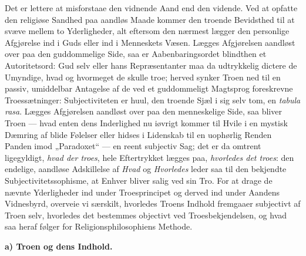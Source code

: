 \documentclass[12pt]{book}
\newcommand{\runhead}[1]{%
  \medskip\begin{center}{\bfseries #1}\end{center}\medskip}
\begin{document}
Det er lettere at misforstaae den vidnende Aand end den vidende. Ved
at opfatte den religiøse Sandhed paa aandløs Maade kommer den
troende Bevidsthed til at svæve mellem to Yderligheder, alt eftersom
den nærmest lægger den personlige Afgjørelse ind i Guds eller ind i
Menneskets Væsen. Lægges Afgjørelsen aandløst over paa den
guddommelige Side, saa er Aabenbaringsordet blindthen et
Autoritetsord: Gud selv eller hans Repræsentanter maa da udtrykkelig
dictere de Umyndige, hvad og hvormeget de skulle troe; herved synker
Troen ned til en passiv, umiddelbar Antagelse af de ved et
guddommeligt Magtsprog foreskrevne Troessætninger: Subjectiviteten
er huul, den troende Sjæl i sig selv tom, en \textit{tabula rasa}.
Lægges Afgjørelsen aandløst over paa den menneskelige Side, saa
bliver Troen --- hvad enten dens Inderlighed nu iøvrigt kommer til
Hvile i en mystisk Dæmring af blide Følelser eller hidses i
Lidenskab til en uophørlig Renden Panden imod „Paradoxet“ --- en
reent subjectiv Sag; det er da omtrent ligegyldigt, \emph{hvad der
troes}, hele Eftertrykket lægges paa, \emph{hvorledes det troes}:
den endelige, aandløse Adskillelse af \emph{Hvad} og
\emph{Hvorledes} leder saa til den bekjendte
Subjectivitetssophisme, at Enhver bliver salig ved sin Tro. For at
drage de nævnte Yderligheder ind under Troesprincipet og derved ind
under Aandens Vidnesbyrd, overveie vi særskilt, hvorledes Troens
Indhold fremgaaer subjectivt af Troen selv, hvorledes det bestemmes
objectivt ved Troesbekjendelsen, og hvad saa heraf følger for
Religionsphilosophiens Methode.

\runhead{a) Troen og dens Indhold.}
\end{document}
